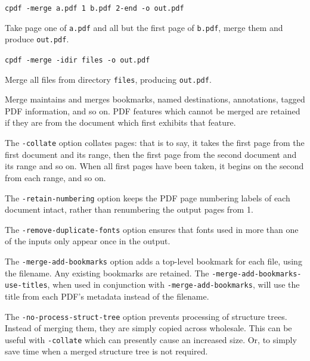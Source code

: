 \documentclass{book}
\begin{document}
  \begin{framed}\small
    \noindent\verb!cpdf -merge a.pdf 1 b.pdf 2-end -o out.pdf!

    \vspace{2.5mm}
    \noindent Take page one of \texttt{a.pdf} and all but the first page of
\texttt{b.pdf}, merge them and produce \texttt{out.pdf}.

    \vspace{1.5mm}
    \noindent\verb!cpdf -merge -idir files -o out.pdf!

    \vspace{2.5mm}
    \noindent Merge all files from directory \texttt{files}, producing \texttt{out.pdf}.

  \end{framed}

\noindent Merge maintains and merges bookmarks, named destinations, annotations, tagged PDF information, and so on. PDF features which cannot be merged are retained if they are from
the document which first exhibits that feature.

The \texttt{-collate} option collates pages: that is to say, it takes the first page from the first document and its range, then the first page from the second document and its range and so on. When all first pages have been taken, it begins on the second from each range, and so on.

The \texttt{-retain-numbering} option keeps the PDF page numbering labels of
each document intact, rather than renumbering the output pages from 1.

The \texttt{-remove-duplicate-fonts} option ensures that fonts used in more than one
of the inputs only appear once in the output.

The \texttt{-merge-add-bookmarks} option adds a top-level bookmark for each file, using the filename. Any existing bookmarks are retained. The \texttt{-merge\--add\--bookmarks\--use\--titles}, when used in conjunction with \texttt{-merge-add-bookmarks}, will use the title from each PDF's metadata instead of the filename.

The \texttt{-no-process-struct-tree} option prevents processing of structure trees. Instead of merging them, they are simply copied across wholesale. This can be useful with \texttt{-collate} which can presently cause an increased size. Or, to simply save time when a merged structure tree is not required.
\end{document}
